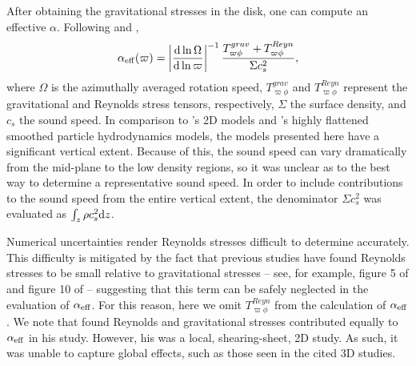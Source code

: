 \documentclass[manuscript]{aastex}
\begin{document}
After obtaining the gravitational stresses in the disk, one can compute an effective $\alpha$. 
Following \cite{gammie2001} and \citet{lodato2004}, 
\begin{equation}
\label{alpha1}
\alpha_{\rm{eff}}(\varpi) = \left| \frac{{\rm d} \ln \Omega}{{\rm d} \ln \varpi} \right|^{-1} 
\frac {T_{\varpi\phi}^{grav} + T_{\varpi\phi}^{Reyn}}
{\Sigma c_s^2 },
\end{equation}
where $\Omega$ is the azimuthally averaged rotation speed, $T_{\varpi\phi}^{grav}$ and $T_{\varpi\phi}^{Reyn}$ represent the  gravitational and Reynolds stress tensors, respectively, $\Sigma$ the surface density,
and $c_s$ the sound speed. In comparison to \citeauthor{gammie2001}'s 2D models and \citeauthor{lodato2004}'s highly flattened smoothed particle hydrodynamics models, the models presented here have a significant vertical extent. Because of this, the sound speed can vary dramatically from the mid-plane to the low density regions, so it was unclear as to the best way to determine a representative sound speed. In order to include contributions to the sound speed from the entire vertical extent, the denominator $\Sigma c_s^2$ was evaluated as $\int_z \rho c_s^2 {\rm d}z$.
 
  

Numerical uncertainties render Reynolds stresses difficult to determine accurately. 
This difficulty is mitigated by the fact that 
previous studies have found Reynolds stresses to be small relative to gravitational stresses -- see, 
for example, figure 5 of \cite{lodato2004} and figure 10 of \cite{boley2006} -- suggesting that this term
can be safely neglected in the evaluation of $\alpha_{\rm{eff}}$.   For this reason, 
here we omit
$T_{\varpi\phi}^{Reyn}$ from the calculation of $\alpha_{\rm{eff}}$. 
We note that \cite{gammie2001}  found
Reynolds and gravitational stresses contributed equally to $\alpha_{\rm{eff}}$ in his study.  However,
his was a local, shearing-sheet, 2D study.  As such, it was unable to capture global effects, such
as those seen in the cited 3D studies.  
\end{document}
